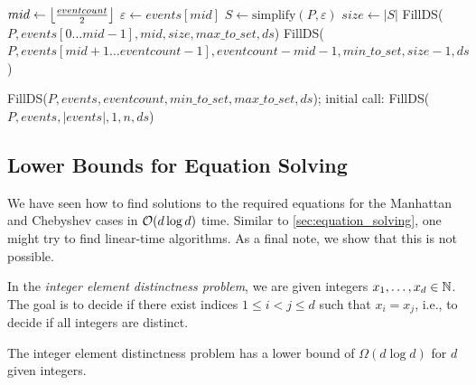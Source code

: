 \begin{algorithm}[ht]
  \DontPrintSemicolon
  \BlankLine
	\(mid \gets \left\lfloor\frac{eventcount}{2}\right\rfloor\)\;
	\(\varepsilon \gets events[mid]\)\;
	\(S \gets \text{simplify}(P, \varepsilon)\) 
	\(size \gets |S|\)\;
	FillDS(\(P, events[0 \dots mid-1], mid, size, max\_to\_set, ds\))\;
	FillDS(\(P, events[mid+1 \dots eventcount-1], eventcount - mid - 1, min\_to\_set, size - 1, ds\))\;
	\caption{FillDS(\(P, events, eventcount, min\_to\_set, max\_to\_set, ds\)); initial call: FillDS(\(P, events, |events|, 1, n, ds\))}
	\label{algo:binary-search-alt}
\end{algorithm}

\subsection{Lower Bounds for Equation Solving}
We have seen how to find solutions to the required equations for the Manhattan and Chebyshev cases in \(\mathcal{O}(d \log d)\) time. Similar to \cref{sec:equation_solving}, one might try to find linear-time algorithms. As a final note, we show that this is not possible.

\begin{definition}
  In the \emph{integer element distinctness problem}, we are given integers \(x_1, \dots, x_d \in \mathbb{N}\). The goal is to decide if there exist indices \(1 \leq i < j \leq d\) such that \(x_i = x_j\), i.e., to decide if all integers are distinct.
\end{definition}

\begin{theorem}
	The integer element distinctness problem has a lower bound of \(\Omega(d \log d)\) for \(d\) given integers.
\end{theorem}

